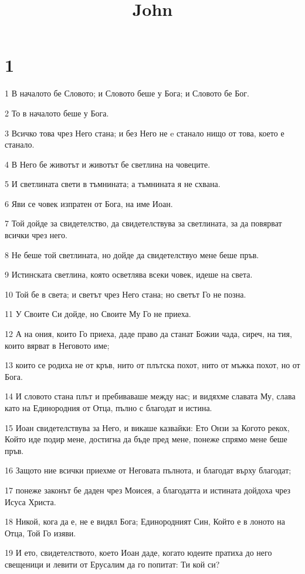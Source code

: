 

\title{John}


\chapter{1}

\par 1 В началото бе Словото; и Словото беше у Бога; и Словото бе Бог.
\par 2 То в началото беше у Бога.
\par 3 Всичко това чрез Него стана; и без Него не e станало нищо от това, което е станало.
\par 4 В Него бе животът и животът бе светлина на човеците.
\par 5 И светлината свети в тъмнината; а тъмнината я не схвана.
\par 6 Яви се човек изпратен от Бога, на име Иоан.
\par 7 Той дойде за свидетелство, да свидетелствува за светлината, за да повярват всички чрез него.
\par 8 Не беше той светлината, но дойде да свидетелствуо мене беше пръв.
\par 9 Истинската светлина, която осветлява всеки човек, идеше на света.
\par 10 Той бе в света; и светът чрез Него стана; но светът Го не позна.
\par 11 У Своите Си дойде, но Своите Му Го не приеха.
\par 12 А на ония, които Го приеха, даде право да станат Божии чада, сиреч, на тия, които вярват в Неговото име;
\par 13 които се родиха не от кръв, нито от плътска похот, нито от мъжка похот, но от Бога.
\par 14 И словото стана плът и пребиваваше между нас; и видяхме славата Му, слава като на Единородния от Отца, пълно с благодат и истина.
\par 15 Иоан свидетелствува за Него, и викаше казвайки: Ето Онзи за Когото рекох, Който иде подир мене, достигна да бъде пред мене, понеже спрямо мене беше пръв.
\par 16 Защото ние всички приехме от Неговата пълнота, и благодат върху благодат;
\par 17 понеже законът бе даден чрез Моисея, а благодатта и истината дойдоха чрез Исуса Христа.
\par 18 Никой, кога да е, не е видял Бога; Единородният Син, Който е в лоното на Отца, Той Го изяви.
\par 19 И ето, свидетелството, което Иоан даде, когато юдеите пратиха до него свещеници и левити от Ерусалим да го попитат: Ти кой си?
